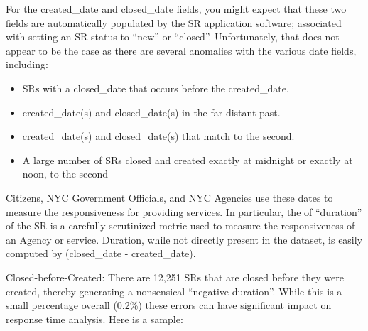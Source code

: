 \documentclass[12pt, titlepage]{article}
\begin{document}
\label{sec:negativeduration}
For the created\_date and closed\_date fields, you might 
expect that these two fields are automatically populated by the 
SR application software; associated with setting an SR status 
to ``new'' or ``closed''. Unfortunately, that does not appear 
to be the case as there are several anomalies with the various date 
fields, including:
	
	
\begin{itemize}
	\item SRs with a closed\_date that occurs before the created\_date.

 	\item created\_date(s) and closed\_date(s) in the far distant past.

 	\item created\_date(s) and closed\_date(s) that match to the second.

	\item A large number of SRs closed and created exactly at midnight 
	or exactly at noon, to the second
\end{itemize}
	
	
Citizens, NYC Government Officials, and NYC Agencies use 
these dates to measure the responsiveness for providing 
services. In particular, the of ``duration'' of the SR 
is a carefully scrutinized metric used to measure the responsiveness
of an Agency or service. Duration, while not directly present 
in the dataset, is easily computed by (closed\_date - created\_date).
	
Closed-before-Created:  There are 12,251 SRs that are closed before they 
were created, thereby generating a nonsensical ``negative duration''. 
While this is a small percentage overall (0.2\%) these errors can 
have significant impact on response time analysis. 
Here is a sample:
\end{document}
